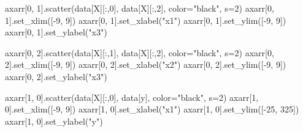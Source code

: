 \documentclass[
  letterpaper,
  DIV=11,
  numbers=noendperiod]{scrartcl}
\newenvironment{Shaded}{\begin{snugshade}}{\end{snugshade}}
\newcommand{\DecValTok}[1]{\textcolor[rgb]{0.68,0.00,0.00}{#1}}
\newcommand{\NormalTok}[1]{\textcolor[rgb]{0.00,0.23,0.31}{#1}}
\newcommand{\OperatorTok}[1]{\textcolor[rgb]{0.37,0.37,0.37}{#1}}
\newcommand{\StringTok}[1]{\textcolor[rgb]{0.13,0.47,0.30}{#1}}
\begin{document}
\begin{Shaded}
\begin{Highlighting}[]
\NormalTok{axarr[}\DecValTok{0}\NormalTok{, }\DecValTok{1}\NormalTok{].scatter(data[}\StringTok{\textquotesingle{}X\textquotesingle{}}\NormalTok{][:,}\DecValTok{0}\NormalTok{], data[}\StringTok{\textquotesingle{}X\textquotesingle{}}\NormalTok{][:,}\DecValTok{2}\NormalTok{],}
\NormalTok{                    color}\OperatorTok{=}\StringTok{"black"}\NormalTok{, s}\OperatorTok{=}\DecValTok{2}\NormalTok{)}
\NormalTok{axarr[}\DecValTok{0}\NormalTok{, }\DecValTok{1}\NormalTok{].set\_xlim([}\OperatorTok{{-}}\DecValTok{9}\NormalTok{, }\DecValTok{9}\NormalTok{])}
\NormalTok{axarr[}\DecValTok{0}\NormalTok{, }\DecValTok{1}\NormalTok{].set\_xlabel(}\StringTok{"x1"}\NormalTok{)}
\NormalTok{axarr[}\DecValTok{0}\NormalTok{, }\DecValTok{1}\NormalTok{].set\_ylim([}\OperatorTok{{-}}\DecValTok{9}\NormalTok{, }\DecValTok{9}\NormalTok{])}
\NormalTok{axarr[}\DecValTok{0}\NormalTok{, }\DecValTok{1}\NormalTok{].set\_ylabel(}\StringTok{"x3"}\NormalTok{)}

\NormalTok{axarr[}\DecValTok{0}\NormalTok{, }\DecValTok{2}\NormalTok{].scatter(data[}\StringTok{\textquotesingle{}X\textquotesingle{}}\NormalTok{][:,}\DecValTok{1}\NormalTok{], data[}\StringTok{\textquotesingle{}X\textquotesingle{}}\NormalTok{][:,}\DecValTok{2}\NormalTok{],}
\NormalTok{                    color}\OperatorTok{=}\StringTok{"black"}\NormalTok{, s}\OperatorTok{=}\DecValTok{2}\NormalTok{)}
\NormalTok{axarr[}\DecValTok{0}\NormalTok{, }\DecValTok{2}\NormalTok{].set\_xlim([}\OperatorTok{{-}}\DecValTok{9}\NormalTok{, }\DecValTok{9}\NormalTok{])}
\NormalTok{axarr[}\DecValTok{0}\NormalTok{, }\DecValTok{2}\NormalTok{].set\_xlabel(}\StringTok{"x2"}\NormalTok{)}
\NormalTok{axarr[}\DecValTok{0}\NormalTok{, }\DecValTok{2}\NormalTok{].set\_ylim([}\OperatorTok{{-}}\DecValTok{9}\NormalTok{, }\DecValTok{9}\NormalTok{])}
\NormalTok{axarr[}\DecValTok{0}\NormalTok{, }\DecValTok{2}\NormalTok{].set\_ylabel(}\StringTok{"x3"}\NormalTok{)}

\NormalTok{axarr[}\DecValTok{1}\NormalTok{, }\DecValTok{0}\NormalTok{].scatter(data[}\StringTok{\textquotesingle{}X\textquotesingle{}}\NormalTok{][:,}\DecValTok{0}\NormalTok{], data[}\StringTok{\textquotesingle{}y\textquotesingle{}}\NormalTok{],}
\NormalTok{                    color}\OperatorTok{=}\StringTok{"black"}\NormalTok{, s}\OperatorTok{=}\DecValTok{2}\NormalTok{)}
\NormalTok{axarr[}\DecValTok{1}\NormalTok{, }\DecValTok{0}\NormalTok{].set\_xlim([}\OperatorTok{{-}}\DecValTok{9}\NormalTok{, }\DecValTok{9}\NormalTok{])}
\NormalTok{axarr[}\DecValTok{1}\NormalTok{, }\DecValTok{0}\NormalTok{].set\_xlabel(}\StringTok{"x1"}\NormalTok{)}
\NormalTok{axarr[}\DecValTok{1}\NormalTok{, }\DecValTok{0}\NormalTok{].set\_ylim([}\OperatorTok{{-}}\DecValTok{25}\NormalTok{, }\DecValTok{325}\NormalTok{])}
\NormalTok{axarr[}\DecValTok{1}\NormalTok{, }\DecValTok{0}\NormalTok{].set\_ylabel(}\StringTok{"y"}\NormalTok{)}


\end{Highlighting}
\end{Shaded}
\end{document}
